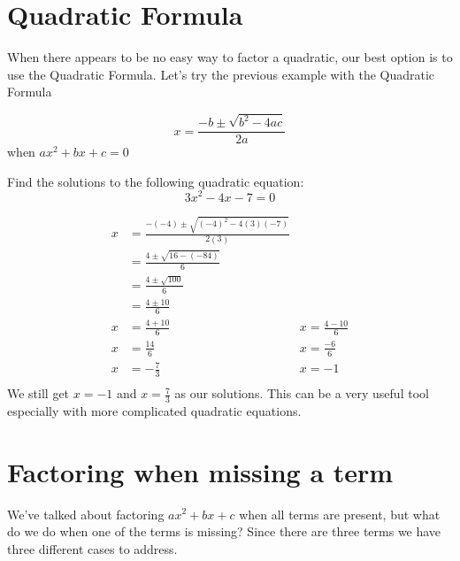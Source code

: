 \documentclass{ximera}
\begin{document}
\section{Quadratic Formula}
When there appears to be no easy way to factor a quadratic, our best option is to use the Quadratic Formula. Let's try the previous example with the Quadratic Formula
\begin{callout}
\[
x=\frac{-b\pm \sqrt{b^2-4ac}}{2a}
\]
when $ax^2+bx+c =0$
\end{callout}
\begin{example}
Find the solutions to the following quadratic equation:
\[
3x^2-4x-7=0
\]
\begin{explanation}
\begin{align*}
x&=\frac{-(-4)\pm \sqrt{(-4)^2-4(3)(-7)}}{2(3)}\\
&=\frac{4 \pm \sqrt{16-(-84)}}{6}\\
&=\frac{4 \pm \sqrt{100}}{6}\\
&=\frac{4 \pm 10}{6}\\
x&=\frac{4+10}{6}&x=\frac{4-10}{6}\\
x&=\frac{14}{6}&x=\frac{-6}{6}\\
x&=-\frac{7}{3}&x=-1\\
\end{align*}
We still get $x=-1$ and $x=\frac{7}{3}$ as our solutions. This can be a very useful tool especially with more complicated quadratic equations.
\end{explanation}
\end{example}
\section{Factoring when missing a term}
We've talked about factoring $ax^2+bx+c$ when all terms are present, but what do we do when one of the terms is missing? Since there are three terms we have three different cases to address.
\end{document}
